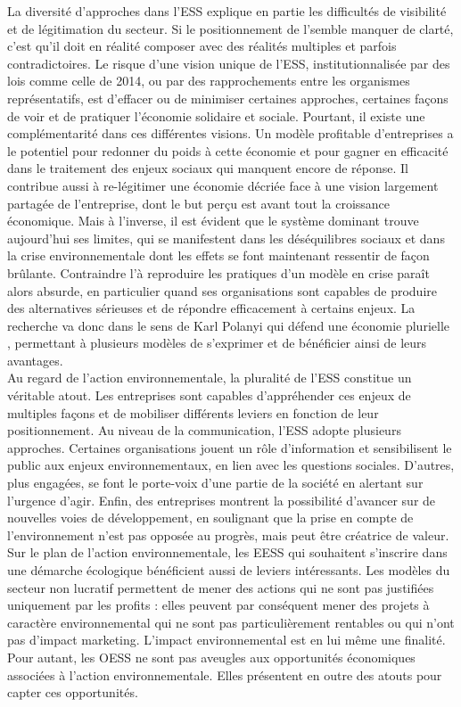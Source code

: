         La diversité d'approches dans l'ESS explique en partie les difficultés de visibilité et de légitimation du secteur. Si le positionnement de l'\ess semble manquer de clarté, c'est qu'il doit en réalité composer avec des réalités multiples et parfois contradictoires. Le risque d'une vision unique de l'ESS, institutionnalisée par des lois comme celle de 2014, ou par des rapprochements entre les organismes représentatifs, est d'effacer ou de minimiser certaines approches, certaines façons de voir et de pratiquer l'économie solidaire et sociale. Pourtant, il existe une complémentarité dans ces différentes visions. Un modèle profitable d'entreprises a le potentiel pour redonner du poids à cette économie et pour gagner en efficacité dans le traitement des enjeux sociaux qui manquent encore de réponse. Il contribue aussi à re-légitimer une économie décriée face à une vision largement partagée de l'entreprise, dont le but perçu est avant tout la croissance économique. Mais à l'inverse, il est évident que le système dominant trouve aujourd'hui ses limites, qui se manifestent dans les déséquilibres sociaux et dans la crise environnementale dont les effets se font maintenant ressentir de façon brûlante. Contraindre l'\ess à reproduire les pratiques d'un modèle en crise paraît alors absurde, en particulier quand ses organisations sont capables de produire des alternatives sérieuses et de répondre efficacement à certains enjeux. La recherche va donc dans le sens de Karl Polanyi qui défend une économie plurielle \parencite{laville2003avec}, permettant à plusieurs modèles de s'exprimer et de bénéficier ainsi de leurs avantages. \\

        Au regard de l'action environnementale, la pluralité de l'ESS constitue un véritable atout. Les entreprises sont capables d'appréhender ces enjeux de multiples façons et de mobiliser différents leviers en fonction de leur positionnement. Au niveau de la communication, l'ESS adopte plusieurs approches. Certaines organisations jouent un rôle d'information et sensibilisent le public aux enjeux environnementaux, en lien avec les questions sociales. D'autres, plus engagées, se font le porte-voix d'une partie de la société en alertant sur l'urgence d'agir. Enfin, des entreprises montrent la possibilité d'avancer sur de nouvelles voies de développement, en soulignant que la prise en compte de l'environnement n'est pas opposée au progrès, mais peut être créatrice de valeur. Sur le plan de l'action environnementale, les EESS qui souhaitent s'inscrire dans une démarche écologique bénéficient aussi de leviers intéressants. Les modèles du secteur non lucratif permettent de mener des actions qui ne sont pas justifiées uniquement par les profits : elles peuvent par conséquent mener des projets à caractère environnemental qui ne sont pas particulièrement rentables ou qui n'ont pas d'impact marketing. L'impact environnemental est en lui même une finalité. Pour autant, les OESS ne sont pas aveugles aux opportunités économiques associées à l'action environnementale. Elles présentent en outre des atouts pour capter ces opportunités. \\

